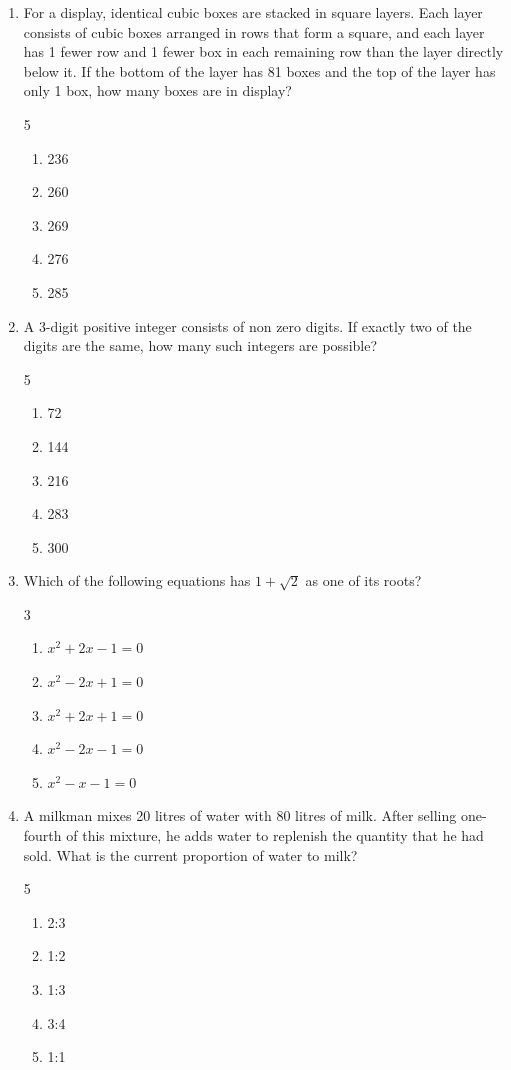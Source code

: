 \documentclass[12pt]{article}
\begin{document}
\begin{enumerate}
\item For a display, identical cubic boxes are stacked in square layers. Each layer consists of cubic boxes arranged in rows that form a square, and each layer has 1 fewer row and 1 fewer box in each remaining row than the layer directly below it. If the bottom of the layer has 81 boxes and the top of the layer has only 1 box, how many boxes are in display?
\begin{multicols}{5}
\begin{enumerate}[label=(\Alph*)]
\item 236
\item 260
\item 269
\item 276
\item 285
\end{enumerate}
\end{multicols}

\item A 3-digit positive integer consists of non zero digits. If exactly two of the digits are the same, how many such integers are possible?
\begin{multicols}{5}
\begin{enumerate}[label=(\Alph*)]
\item 72
\item 144
\item 216
\item 283
\item 300
\end{enumerate}
\end{multicols}

\item Which of the following equations has $1 + \sqrt{2}$ as one of its roots?
\begin{multicols}{3}
\begin{enumerate}[label=(\Alph*)]
\item $x^2 + 2x - 1 = 0$
\item $x^2 - 2x + 1 = 0$
\item $x^2 + 2x + 1 = 0$
\item $x^2 - 2x - 1 = 0$
\item $x^2 - x - 1 = 0$
\end{enumerate}
\end{multicols}

\item A milkman mixes 20 litres of water with 80 litres of milk. After selling one-fourth of this mixture, he adds water to replenish the quantity that he had sold. What is the current proportion of water to milk?
\begin{multicols}{5}
\begin{enumerate}[label=(\Alph*)]
\item 2:3
\item 1:2
\item 1:3
\item 3:4
\item 1:1
\end{enumerate}
\end{multicols}


\end{enumerate}
\end{document}
